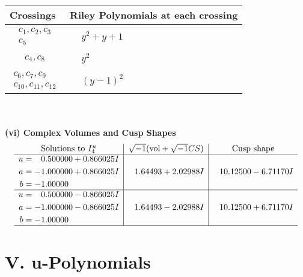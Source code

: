 \documentclass[1p]{elsarticle_modified}
\theoremstyle{definition}
\newcommand{\I}{\sqrt{-1}}
\begin{document}
\begin{tabular}{m{50pt}|m{274pt}}
Crossings & \hspace{64pt}Riley Polynomials at each crossing \\
\hline $$\begin{aligned}c_{1},c_{2},c_{3}\\c_{5}\end{aligned}$$&$\begin{aligned}
&y^2+y+1
\end{aligned}$\\
\hline $$\begin{aligned}c_{4},c_{8}\end{aligned}$$&$\begin{aligned}
&y^2
\end{aligned}$\\
\hline $$\begin{aligned}c_{6},c_{7},c_{9}\\c_{10},c_{11},c_{12}\end{aligned}$$&$\begin{aligned}
&(y-1)^2
\end{aligned}$\\
\hline
\end{tabular}\\~\\
\newpage\flushleft \textbf{(vi) Complex Volumes and Cusp Shapes}
$$\begin{array}{c|c|c}  
\text{Solutions to }I^u_{4}& \I (\text{vol} + \sqrt{-1}CS) & \text{Cusp shape}\\
 \hline 
\begin{aligned}
u &= \phantom{-}0.500000 + 0.866025 I \\
a &= -1.000000 + 0.866025 I \\
b &= -1.00000\phantom{ +0.000000I}\end{aligned}
 & \phantom{-}1.64493 + 2.02988 I & \phantom{-}10.12500 - 6.71170 I \\ \hline\begin{aligned}
u &= \phantom{-}0.500000 - 0.866025 I \\
a &= -1.000000 - 0.866025 I \\
b &= -1.00000\phantom{ +0.000000I}\end{aligned}
 & \phantom{-}1.64493 - 2.02988 I & \phantom{-}10.12500 + 6.71170 I\\
 \hline 
 \end{array}$$\newpage
\newpage\renewcommand{\arraystretch}{1}
\centering \section*{ V. u-Polynomials}
\end{document}
